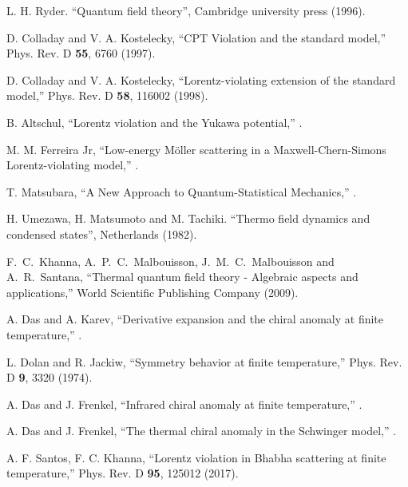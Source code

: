 \documentclass[11pt,showpacs,preprintnumbers,amsmath,amssymb,prd,nofootinbib,superscriptaddress]{revtex4-2}
\begin{document}
\begin{thebibliography}{99}
 L. H. Ryder. ``Quantum field theory'', Cambridge university press (1996).

 D. Colladay and V. A. Kostelecky, ``CPT Violation and the standard model,''  {{Phys. Rev. D} {\bf 55}, 6760 (1997)}.

 D. Colladay and V. A. Kostelecky, ``Lorentz-violating extension of the standard model,''  {{Phys. Rev. D} {\bf 58}, 116002 (1998)}.

 B. Altschul, ``Lorentz violation and the Yukawa potential,'' .

 M. M. Ferreira Jr, ``Low-energy M\"oller scattering in a Maxwell-Chern-Simons Lorentz-violating model,'' .

 T. Matsubara, ``A New Approach to Quantum-Statistical Mechanics,'' .

 H. Umezawa, H. Matsumoto and M. Tachiki. ``Thermo field dynamics and condensed states'', Netherlands (1982).

  F.~C.~Khanna, A.~P.~C.~Malbouisson, J.~M.~C.~Malbouisson and A.~R.~Santana,
``Thermal quantum field theory - Algebraic aspects and applications,''
World Scientific Publishing Company (2009).

 A. Das and A. Karev, ``Derivative expansion and the chiral anomaly at finite temperature,'' .

 L. Dolan and R. Jackiw, ``Symmetry behavior at finite temperature,''  {{Phys. Rev. D} {\bf 9}, 3320 (1974)}.

 A. Das and J. Frenkel, ``Infrared chiral anomaly at finite temperature,'' .

 A. Das and J. Frenkel, ``The thermal chiral anomaly in the Schwinger model,'' .


 A. F. Santos, F. C. Khanna, ``Lorentz violation in Bhabha scattering at finite temperature,''  {{Phys. Rev. D} {\bf 95}, 125012 (2017)}.


\end{thebibliography}
\end{document}
